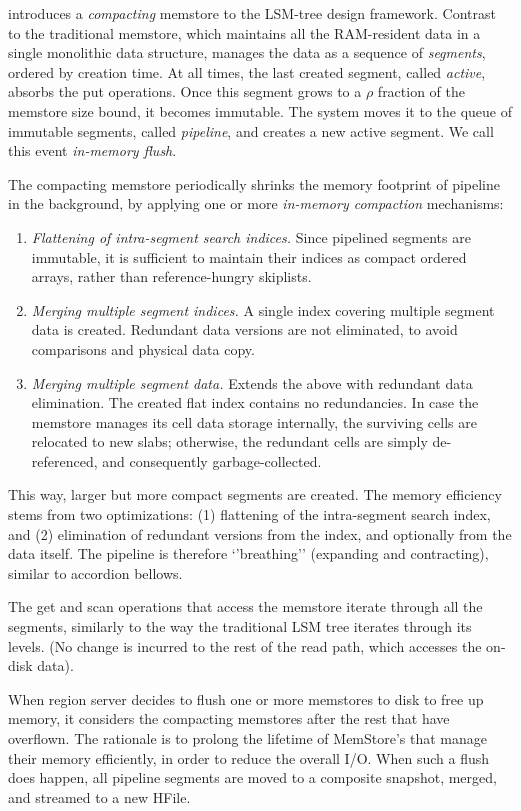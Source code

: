 \sys\/ introduces a {\em compacting\/} memstore to the LSM-tree design framework. Contrast to the traditional memstore, 
which maintains all the RAM-resident data in a single monolithic data structure, \sys\/ manages the data as a sequence of 
{\em segments}, ordered by creation time. At all times, the last created segment, called {\em active}, absorbs the put operations. 
Once this segment grows to a $\rho$ fraction of the memstore size bound, it becomes immutable. 
The system moves it to the queue of immutable segments, called {\em pipeline}, and creates a new active segment. 
We call this event {\em in-memory flush}. 

The compacting memstore periodically shrinks the memory footprint of pipeline in the background, by applying one or more 
{\em in-memory compaction} mechanisms: 
\begin{enumerate}
\item {\em Flattening of intra-segment search indices.} Since pipelined segments are immutable, it is sufficient to maintain 
their indices as compact ordered arrays, rather than reference-hungry skiplists.  
\item {\em Merging multiple segment indices.} A single index covering multiple segment data is created. Redundant data 
versions are not eliminated, to avoid comparisons and physical data copy. 
\item  {\em Merging multiple segment data.} Extends the above with redundant data elimination. The created flat index 
contains no redundancies. In case the memstore manages its cell data storage internally, the surviving cells are relocated
to new slabs; otherwise, the redundant cells are simply de-referenced, and consequently garbage-collected.    
\end{enumerate} 
 
This way, larger but more compact segments are created. The memory efficiency stems from two optimizations: (1) flattening 
of the intra-segment search index, and (2) elimination of redundant versions from the index, and optionally from the data itself. 
The pipeline is therefore `'breathing'' (expanding and contracting), similar to accordion bellows. 

The get and scan operations that access the memstore iterate through all the segments, similarly to the way the traditional 
LSM tree iterates through its levels. (No change is incurred to the rest of the read path, which accesses the on-disk data). 


When region server decides to flush one or more memstores to disk to free up memory, it considers the compacting memstores 
after the rest that have overflown. The rationale is to prolong the lifetime of MemStore’s that manage their memory efficiently, in order to reduce the overall I/O. When such a flush does happen, all pipeline segments are moved to a composite snapshot,  merged, and streamed to a new HFile. 

